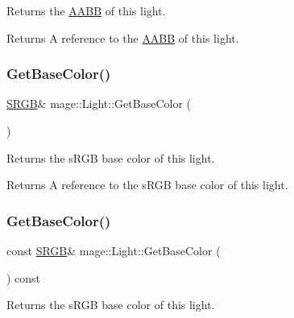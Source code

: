 Returns the \hyperlink{structmage_1_1_a_a_b_b}{A\+A\+BB} of this light.

\begin{DoxyReturn}{Returns}
A reference to the \hyperlink{structmage_1_1_a_a_b_b}{A\+A\+BB} of this light. 
\end{DoxyReturn}
\hypertarget{classmage_1_1_light_ab91bc6fe671417f49c63346d1ed83576}{}\label{classmage_1_1_light_ab91bc6fe671417f49c63346d1ed83576} 
\subsubsection{\texorpdfstring{Get\+Base\+Color()}{GetBaseColor()}\hspace{0.1cm}{\footnotesize\ttfamily [1/2]}}
{\footnotesize\ttfamily \hyperlink{structmage_1_1_s_r_g_b}{S\+R\+GB}\& mage\+::\+Light\+::\+Get\+Base\+Color (\begin{DoxyParamCaption}{ }\end{DoxyParamCaption})\hspace{0.3cm}{\ttfamily [noexcept]}}

Returns the s\+R\+GB base color of this light.

\begin{DoxyReturn}{Returns}
A reference to the s\+R\+GB base color of this light. 
\end{DoxyReturn}
\hypertarget{classmage_1_1_light_a3dfe7de799e39693b7243379650f281f}{}\label{classmage_1_1_light_a3dfe7de799e39693b7243379650f281f} 
\subsubsection{\texorpdfstring{Get\+Base\+Color()}{GetBaseColor()}\hspace{0.1cm}{\footnotesize\ttfamily [2/2]}}
{\footnotesize\ttfamily const \hyperlink{structmage_1_1_s_r_g_b}{S\+R\+GB}\& mage\+::\+Light\+::\+Get\+Base\+Color (\begin{DoxyParamCaption}{ }\end{DoxyParamCaption}) const\hspace{0.3cm}{\ttfamily [noexcept]}}

Returns the s\+R\+GB base color of this light.

